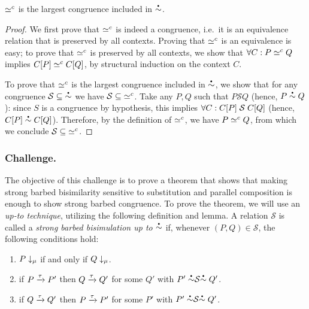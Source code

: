 \begin{lemma}
  \( \simeq^c \) is the largest congruence included in
  \( \sbbisim{}{} \).
\end{lemma}
\begin{proof}
  We first prove that \( \simeq^c \) is indeed a congruence, i.e.~it is an
  equivalence relation that is preserved by all contexts.  Proving that \(
  \simeq^c \) is an equivalence is easy; to prove that \( \simeq^c \)  is
  preserved by all contexts, we show that $\forall C: P \simeq^c Q$ implies
  $C[P] \simeq^c C[Q]$, by structural induction on the
  context $C$.

  To prove that \(\simeq^c\) is the largest congruence included in
  \(\sbbisim{}{}\), we show that for any congruence $\mathcal{S} \subseteq
  {\sbbisim{}{}}$ we have $\mathcal{S} \subseteq { \simeq^c }$. Take any $P,Q$
  such that $P \mathrel{\mathcal{S}} Q$ (hence, $\sbbisim{P}{Q}$): since $S$ is
  a congruence by hypothesis, this implies $\forall C: C[P]
  \mathrel{\mathcal{S}} C[Q]$ (hence,
  $\sbbisim{\applyctx{C}{P}}{\applyctx{C}{Q}}$). %
  Therefore, by the definition of \(\simeq^c\), we have $P \simeq^c Q$,
  from which we conclude $\mathcal{S} \subseteq { \simeq^c }$.
\end{proof}

\subsubsection{Challenge.}
The objective of this challenge is to prove a theorem that shows that
making strong barbed bisimilarity sensitive to substitution and
parallel composition is enough to show strong barbed
congruence.
To prove the theorem, we will use an \emph{up-to technique}, utilizing the following definition and lemma.
A relation \( \mathcal{S} \) is called a \emph{strong barbed bisimulation up to \( \sbbisim{}{} \)} if, whenever \( (P,Q) \in \mathcal{S} \), the following conditions hold:
\begin{enumerate}
\item \( P\downarrow_{\mu} \) if and only if \( Q\downarrow_{\mu} \).
\item if \( P \xrightarrow{\tau} P' \) then \( Q \xrightarrow{\tau} Q' \) for some \( Q' \) with \( \uptosbb{P'}{\mathcal{S}}{Q'} \).
\item if \( Q \xrightarrow{\tau} Q' \) then \( P \xrightarrow{\tau} P' \) for some \( P' \) with \( \uptosbb{P'}{\mathcal{S}}{Q'} \).
\end{enumerate}

